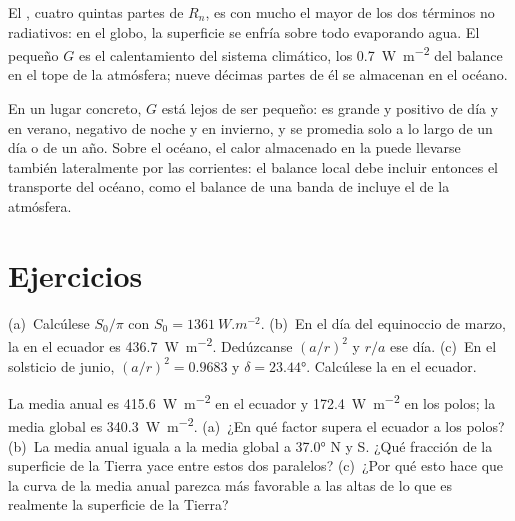 El , cuatro quintas partes de $R_n$, es con mucho el mayor de los dos términos no radiativos: en el globo, la superficie se enfría sobre todo evaporando agua. El pequeño $G$ es el calentamiento del sistema climático, los \qty{0.7}{W.m^{-2}} del balance en el tope de la atmósfera; nueve décimas partes de él se almacenan en el océano.

\begin{remark}\label{rem:b1:radiation-heat-transport:local}
En un lugar concreto, $G$ está lejos de ser pequeño: es grande y positivo de día y en verano, negativo de noche y en invierno, y se promedia solo a lo largo de un día o de un año. Sobre el océano, el calor almacenado en la  puede llevarse también lateralmente por las corrientes: el balance local debe incluir entonces el transporte del océano, como el balance de una banda de  incluye el de la atmósfera.
\end{remark}

\section{Ejercicios}

\begin{exercise}[$\star$]\label{exo:b1:radiation-heat-transport:1}
(a)~Calcúlese $S_0/\pi$ con $S_0 = \qty{1361}{W.m^{-2}}$. (b)~En el día del equinoccio de marzo, la  en el ecuador es \qty{436.7}{W.m^{-2}}. Dedúzcanse
$(a/r)^2$ y $r/a$ ese día. (c)~En el solsticio de junio, $(a/r)^2 = 0.9683$ y $\delta = \ang{23.44}$. Calcúlese la  en el ecuador.
\end{exercise}

\begin{exercise}[$\star$]\label{exo:b1:radiation-heat-transport:2}
La  media anual es \qty{415.6}{W.m^{-2}} en el ecuador y \qty{172.4}{W.m^{-2}} en los polos; la media global es \qty{340.3}{W.m^{-2}}. (a)~¿En qué factor supera el ecuador a los polos? (b)~La media anual iguala a la media global a \ang{37.0} N y S. ¿Qué fracción de la superficie de la Tierra yace entre estos dos paralelos? (c)~¿Por qué esto hace que la curva de la media anual parezca más favorable a las altas  de lo que es realmente la superficie de la Tierra?
\end{exercise}

